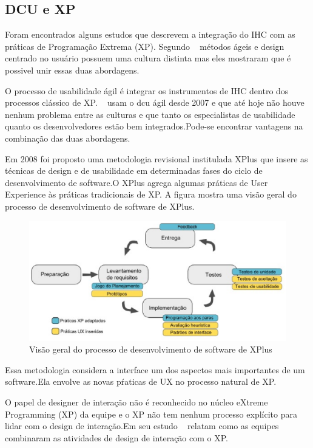 \subsection {DCU e XP}

	Foram encontrados alguns estudos que descrevem a integração do IHC com as práticas de Programação Extrema (XP). Segundo ~ métodos ágeis e design centrado no usuário possuem uma cultura distinta mas eles mostraram que é possivel unir essas duas abordagens.

	O processo de usabilidade ágil é integrar os instrumentos de IHC dentro dos processos clássico de XP. ~ usam o dcu ágil desde 2007 e que até hoje não houve nenhum problema entre as culturas e que tanto os especialistas de usabilidade quanto os desenvolvedores estão bem integrados.Pode-se encontrar vantagens na combinação das duas abordagens. 

	Em 2008 foi proposto uma metodologia revisional institulada XPlus que insere as técnicas de design e de usabilidade em determinadas fases do ciclo de desenvolvimento de software.O XPlus agrega algumas práticas de User Experience às práticas tradicionais de XP. A figura mostra uma visão geral do processo de desenvolvimento de software de XPlus.~\cite{guimaraesxplus}

\begin{figure}[h]
    \centering
    \includegraphics[keepaspectratio=true,scale=0.60]
      {figuras/xplus.eps}
    \caption{Visão geral do processo de desenvolvimento de software de XPlus}
    \label{ciclo_xplus}
\end{figure}

	Essa metodologia considera a interface um dos aspectos mais importantes de um software.Ela envolve as novas pŕaticas de UX no processo natural de XP.

	O papel de designer de interação não é reconhecido no núcleo eXtreme Programming (XP) da equipe e o XP não tem nenhum processo explícito para lidar com o design de interação.Em seu estudo ~ relatam como as equipes combinaram as atividades de design de interação com o XP. 

